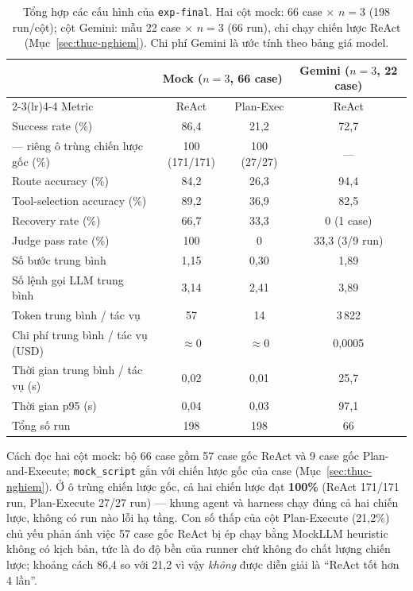 \begin{table}[ht]
\centering
\caption{Tổng hợp các cấu hình của \texttt{exp-final}. Hai cột mock: 66
case $\times$ $n=3$ (198 run/cột); cột Gemini: mẫu 22 case $\times$ $n=3$
(66 run), chỉ chạy chiến lược ReAct (Mục~\ref{sec:thuc-nghiem}). Chi phí
Gemini là ước tính theo bảng giá model.}
\label{tab:ket-qua-tong-hop}
\begin{tabular}{lccc}
\toprule
 & \multicolumn{2}{c}{Mock ($n=3$, 66 case)} & Gemini ($n=3$, 22 case) \\
\cmidrule(lr){2-3}\cmidrule(lr){4-4}
Metric & ReAct & Plan-Exec & ReAct \\
\midrule
Success rate (\%)                  & 86{,}4 & 21{,}2 & 72{,}7 \\
--- riêng ô trùng chiến lược gốc (\%) & 100 (171/171) & 100 (27/27) & --- \\
Route accuracy (\%)                & 84{,}2 & 26{,}3 & 94{,}4 \\
Tool-selection accuracy (\%)       & 89{,}2 & 36{,}9 & 82{,}5 \\
Recovery rate (\%)                 & 66{,}7 & 33{,}3 & 0 (1 case) \\
Judge pass rate (\%)               & 100    & 0      & 33{,}3 (3/9 run) \\
Số bước trung bình                 & 1{,}15 & 0{,}30 & 1{,}89 \\
Số lệnh gọi LLM trung bình         & 3{,}14 & 2{,}41 & 3{,}89 \\
Token trung bình / tác vụ          & 57     & 14     & 3\,822 \\
Chi phí trung bình / tác vụ (USD)  & $\approx 0$ & $\approx 0$ & 0{,}0005 \\
Thời gian trung bình / tác vụ (s)  & 0{,}02 & 0{,}01 & 25{,}7 \\
Thời gian p95 (s)                  & 0{,}04 & 0{,}03 & 97{,}1 \\
\midrule
Tổng số run                        & 198    & 198    & 66 \\
\bottomrule
\end{tabular}
\end{table}

Cách đọc hai cột mock: bộ 66 case gồm 57 case gốc ReAct và 9 case gốc
Plan-and-Execute; \texttt{mock\_script} gắn với chiến lược gốc của case
(Mục~\ref{sec:thuc-nghiem}). Ở ô trùng chiến lược gốc, cả hai chiến lược
đạt \textbf{100\%} (ReAct 171/171 run, Plan-Execute 27/27 run) --- khung
agent và harness chạy đúng cả hai chiến lược, không có run nào lỗi hạ
tầng. Con số thấp của cột Plan-Execute (21{,}2\%) chủ yếu phản ánh việc 57
case gốc ReAct bị ép chạy bằng MockLLM heuristic không có kịch bản, tức là
đo độ bền của runner chứ không đo chất lượng chiến lược; khoảng cách
86{,}4 so với 21{,}2 vì vậy \emph{không} được diễn giải là ``ReAct tốt hơn
4 lần''.

